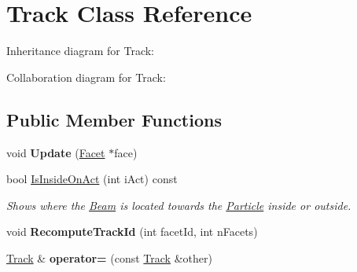 \hypertarget{class_track}{}\section{Track Class Reference}
\label{class_track}


Inheritance diagram for Track\+:


Collaboration diagram for Track\+:
\subsection*{Public Member Functions}
\begin{DoxyCompactItemize}
\item 
\mbox{\label{class_track_a4df6f946922339d5f9f64d4b6a0ce27c}} 
void {\bfseries Update} (\mbox{\hyperlink{class_facet}{Facet}} $\ast$face)
\item 
bool \mbox{\hyperlink{class_track_afa8ecb5618ed9ecefab2ea5f0e755d44}{Is\+Inside\+On\+Act}} (int i\+Act) const
\begin{DoxyCompactList}\small\item\em Shows where the \mbox{\hyperlink{class_beam}{Beam}} is located towards the \mbox{\hyperlink{class_particle}{Particle}} inside or outside. \end{DoxyCompactList}\item 
\mbox{\label{class_track_aa9152f9a092de15ac7e92cf7120222eb}} 
void {\bfseries Recompute\+Track\+Id} (int facet\+Id, int n\+Facets)
\item 
\mbox{\label{class_track_a5c9b01364289589a2dfaf4a865a88cf1}} 
\mbox{\hyperlink{class_track}{Track}} \& {\bfseries operator=} (const \mbox{\hyperlink{class_track}{Track}} \&other)
\end{DoxyCompactItemize}
